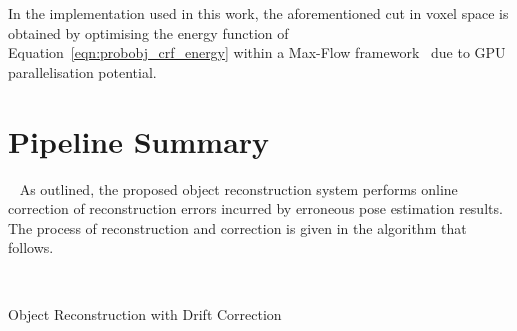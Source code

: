 In the implementation used in this work, the aforementioned cut in voxel space
is obtained by optimising the energy function of Equation~\ref{eqn:probobj_crf_energy} 
within a Max-Flow framework~\cite{Boykov2001} due to GPU parallelisation potential.

\section{Pipeline Summary}
~\label{sec:probobj_pipeline_summary}
As outlined, the proposed object reconstruction system performs online correction of 
reconstruction errors incurred by erroneous pose estimation results. The process of 
reconstruction and correction is given in the algorithm that follows.

{
  \centering
  \singlespacing{}
  \begin{minipage}{\linewidth}
    \begin{algorithm}[H]
~\label{alg:probobj}
      \caption{Object Reconstruction with Drift Correction}
      \begin{algorithmic}[1]

           
              
              


              \EndIf{}
            \EndIf{}
          \EndFor{}


\end{algorithmic}
\end{algorithm}
\end{minipage}}

